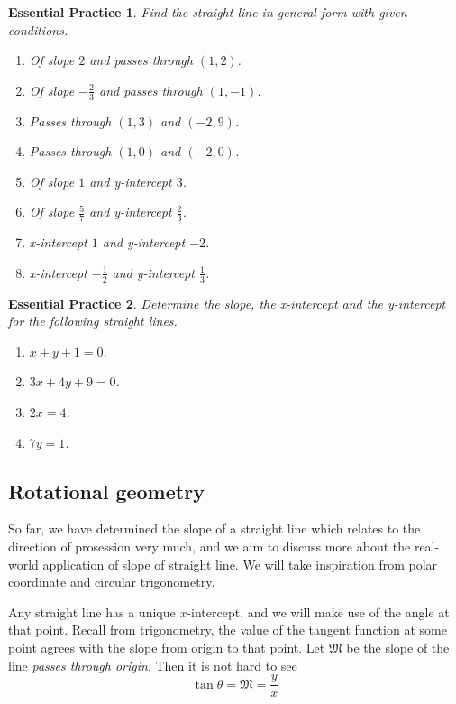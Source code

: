 \documentclass[12pt]{article}
\newtheorem{exercise}{Essential Practice}[subsection]
\begin{document}
    \begin{exercise}
        Find the straight line in general form with given conditions. \begin{enumerate}
            \item Of slope $2$ and passes through $(1,2)$.
            \item Of slope $-\frac{2}{3}$ and passes through $(1,-1)$.
            \item Passes through $(1,3)$ and $(-2,9)$.
            \item Passes through $(1,0)$ and $(-2,0)$.
            \item Of slope $1$ and y-intercept $3$.
            \item Of slope $\frac{5}{7}$ and y-intercept $\frac{2}{3}$.
            \item x-intercept $1$ and y-intercept $-2$.
            \item x-intercept $-\frac{1}{2}$ and y-intercept $\frac{1}{3}$.
        \end{enumerate}
    \end{exercise}

    \begin{exercise}
        Determine the slope, the x-intercept and the y-intercept for the following straight lines.\begin{enumerate}
            \item $x+y+1=0$.
            \item $3x+4y+9=0$.
            \item $2x=4$.
            \item $7y=1$.
        \end{enumerate}
    \end{exercise}

    \subsection{Rotational geometry}

    So far, we have determined the slope of a straight line which relates to the direction of prosession very much, and we aim to discuss more about the real-world application of slope of straight line. We will take inspiration from polar coordinate and circular trigonometry.

    Any straight line has a unique $x$-intercept, and we will make use of the angle at that point. Recall from trigonometry, the value of the tangent function at some point agrees with the slope from origin to that point. Let $\mathfrak{M}$ be the slope of the line \textit{passes through origin}. Then it is not hard to see \[\tan{\theta}=\mathfrak{M}=\frac{y}{x}\]
\end{document}
